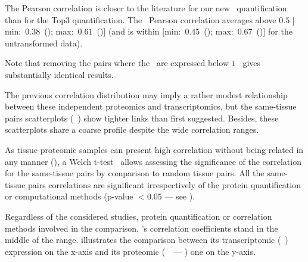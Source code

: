 The Pearson correlation is closer to the literature
for our new \PPKM\ quantification
than for the Top3 quantification.
The \PPKM\ Pearson correlation averages
above $0.5$ $[$min:~$0.38$~(\Oesophagus)\;; max:~$0.61$~(\Liver)$]$
(and is within $[$min:~$0.45$~(\Oesophagus)\;; max:~$0.67$~(\Liver)$]$
for the untransformed data).\\
\vspace{-\baselineskip}

Note that removing the pairs where the \mRNAs\ are expressed below $1$ \FPKM\
gives substantially identical results.

The previous correlation distribution
may imply a rather modest relationship between
these independent proteomics and transcriptomics,
but the same-tissue pairs scatterplots (\eg\ )
show tighter links than first suggested.
Besides, these scatterplots share a coarse profile
despite the wide correlation ranges.\\
\vspace{-\baselineskip}

As tissue proteomic samples can present high correlation
without being related in any manner
(),
a Welch t-test~ allows
assessing the significance of the correlation for the same-tissue pairs
by comparison to random tissue pairs.
All the same-tissue pairs correlations are significant
irrespectively of the protein quantification or computational methods
(p-value $<0.05$ --- see \Cref{tab:pvalueCorrSP}).%

Regardless of the considered studies,
protein quantification or correlation methods involved in the comparison,
\kidney's correlation coefficients stand in the middle of the range.
\Cref{fig:ScatKid} illustrates the comparison
between its transcriptomic (\uhlen\ \etal) expression on the x-axis
and its proteomic (\pandey\ \etal\ --- \PPKM) one on the y-axis.


